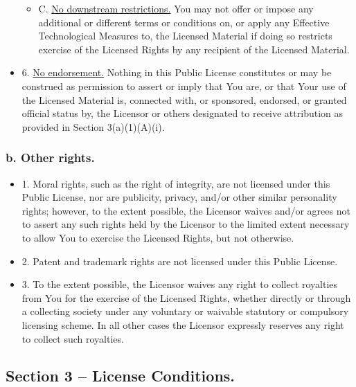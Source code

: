 \begin{itemize}
\begin{itemize}
				\item C. \underline{No downstream restrictions.} You may not offer or impose any additional or different terms or conditions on, or apply any Effective Technological Measures to, the Licensed Material if doing so restricts exercise of the Licensed Rights by any recipient of the Licensed Material.
			\end{itemize}
		\item 6. \underline {No endorsement.} Nothing in this Public License constitutes or may be construed as permission to assert or imply that You are, or that Your use of the Licensed Material is, connected with, or sponsored, endorsed, or granted official status by, the Licensor or others designated to receive attribution as provided in Section 3(a)(1)(A)(i).
	\end{itemize}

\subsubsection*{b. Other rights.}
	\begin{itemize}
		\item 1. Moral rights, such as the right of integrity, are not licensed under this Public License, nor are publicity, privacy, and/or other similar personality rights; however, to the extent possible, the Licensor waives and/or agrees not to assert any such rights held by the Licensor to the limited extent necessary to allow You to exercise the Licensed Rights, but not otherwise.
		\item 2. Patent and trademark rights are not licensed under this Public License.
		\item 3. To the extent possible, the Licensor waives any right to collect royalties from You for the exercise of the Licensed Rights, whether directly or through a collecting society under any voluntary or waivable statutory or compulsory licensing scheme. In all other cases the Licensor expressly reserves any right to collect such royalties.
	\end{itemize}

\subsection*{Section 3 – License Conditions.}

